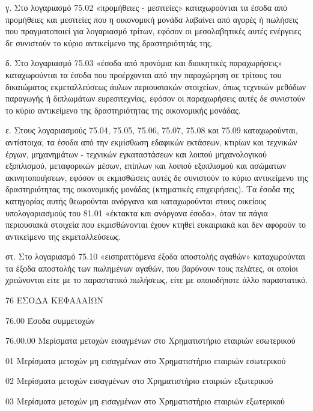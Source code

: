 \documentclass[A4,10pt,greek]{book}
\begin{document}
γ. Στο λογαριασμό 75.02 «προμήθειες - μεσιτείες» καταχωρούνται τα έσοδα από προμήθειες και μεσιτείες που η οικονομική μονάδα λαβαίνει από αγορές ή πωλήσεις που πραγματοποιεί για λογαριασμό τρίτων, εφόσον οι μεσολαβητικές αυτές ενέργειες δε συνιστούν το κύριο αντικείμενο της δραστηριότητάς της.

δ. Στο λογαριασμό 75.03 «έσοδα από προνόμια και διοικητικές παραχωρήσεις» καταχωρούνται τα έσοδα που προέρχονται από την παραχώρηση σε τρίτους του δικαιώματος εκμεταλλεύσεως άυλων περιουσιακών στοιχείων, όπως τεχνικών μεθόδων παραγωγής ή διπλωμάτων ευρεσιτεχνίας, εφόσον οι παραχωρήσεις αυτές δε συνιστούν το κύριο αντικείμενο της δραστηριότητας της οικονομικής μονάδας.

ε. Στους λογαριασμούς 75.04, 75.05, 75.06, 75.07, 75.08 και 75.09 καταχωρούνται, αντίστοιχα, τα έσοδα από την εκμίσθωση εδαφικών εκτάσεων, κτιρίων και τεχνικών έργων, μηχανημάτων - τεχνικών εγκαταστάσεων και λοιπού μηχανολογικού εξοπλισμού, μεταφορικών μέσων, επίπλων και λοιπού εξοπλισμού και ασώματων ακινητοποιήσεων, εφόσον οι εκμισθώσεις αυτές δε συνιστούν το κύριο αντικείμενο της δραστηριότητας της οικονομικής μονάδας (κτηματικές επιχειρήσεις). Τα έσοδα της κατηγορίας αυτής θεωρούνται ανόργανα και καταχωρούνται στους οικείους υπολογαριασμούς του 81.01 «έκτακτα και ανόργανα έσοδα», όταν τα πάγια περιουσιακά στοιχεία που εκμισθώνονται έχουν κτηθεί ευκαιριακά και δεν αφορούν το αντικείμενο της εκμεταλλεύσεως.

στ. Στο λογαριασμό 75.10 «εισπραττόμενα έξοδα αποστολής αγαθών» καταχωρούνται τα έξοδα αποστολής των πωλημένων αγαθών, που βαρύνουν τους πελάτες, οι οποίοι χρεώνονται είτε με το παραστατικό πωλήσεως, είτε με οποιοδήποτε άλλο παραστατικό.

76    ΕΣΟΔΑ ΚΕΦΑΛΑΙΩΝ 

        76.00    Έσοδα συμμετοχών 

                     76.00.00    Μερίσματα μετοχών εισαγμένων στο Χρηματιστήριο εταιριών
                                       εσωτερικού 

                               01    Μερίσματα μετοχών μη εισαγμένων στο Χρηματιστήριο
                                       εταιριών εσωτερικού 

                               02    Μερίσματα μετοχών εισαγμένων στο Χρηματιστήριο εταιριών
                                       εξωτερικού 

                               03    Μερίσματα μετοχών μη εισαγμένων στο Χρηματιστήριο
                                       εταιριών εξωτερικού 
\end{document}

